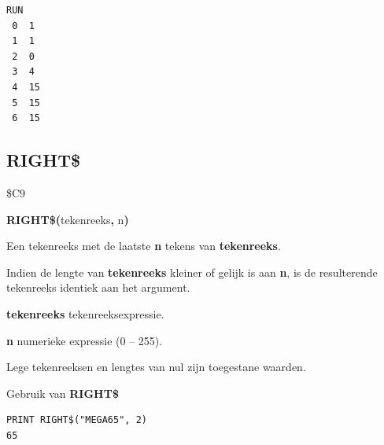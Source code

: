 \begin{description}[leftmargin=2cm,style=nextline]
\begin{tcolorbox}[colback=black,coltext=white]
\begin{verbatim}
RUN
 0  1
 1  1
 2  0
 3  4
 4  15
 5  15
 6  15
\end{verbatim}
\end{tcolorbox}
\end{description}


\newpage
\subsection{RIGHT\$}
\begin{description}[leftmargin=2cm,style=nextline]
\item [Token:]    \$C9

\item [Formaat:]   {\bf RIGHT\$(}tekenreeks{\bf,} n{\bf)}

\item [Retourneert:]  Een tekenreeks met de laatste {\bf n} tekens van {\bf tekenreeks}.

                  Indien de lengte van {\bf tekenreeks} kleiner of gelijk is aan {\bf n}, is de resulterende tekenreeks identiek aan het argument.

{\bf tekenreeks} tekenreeksexpressie.

                  {\bf n} numerieke expressie (0 -- 255).

\item [Opmerkingen:]  Lege tekenreeksen en lengtes van nul zijn toegestane waarden.

\item [Voorbeeld:]  Gebruik van {\bf RIGHT\$}

\begin{tcolorbox}[colback=black,coltext=white]
\verbatimfont{\codefont}
\begin{verbatim}
PRINT RIGHT$("MEGA65", 2)
65
\end{verbatim}
\end{tcolorbox}
\end{description}


\newpage
